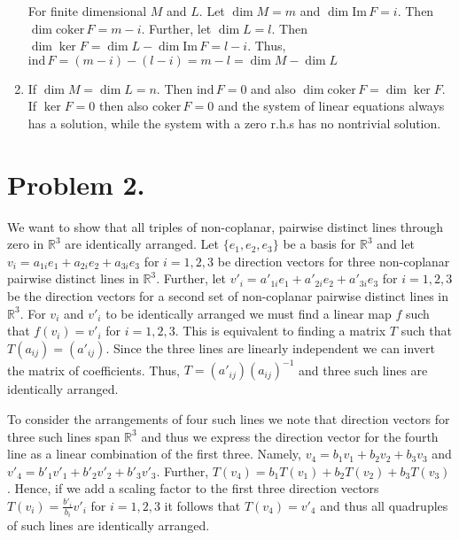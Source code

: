 \documentclass[11pt]{amsart}
\newcommand{\field}[1]{\mathbb{#1}}
\newcommand{\coker}{\textrm{coker}\,}
\newcommand{\Image}{\textrm{Im}\,}
\newcommand{\ind}{\textrm{ind}\,}
\begin{document}
\begin{enumerate}
  For finite dimensional $M$ and $L$. Let $\dim M=m$ and $\dim \Image
  F=i$. Then $\dim \coker F=m-i$.  Further, let $\dim L=l$. Then $\dim
  \ker F = \dim L - \dim \Image F = l-i$. Thus, $\ind F = (m-i) -
  (l-i) = m-l= \dim M - \dim L$ 
\item If $\dim M=\dim L=n$. Then $\ind F=0$ and also $\dim \coker F =
  \dim \ker F$. If $\ker F=0$ then also $\coker F=0$ and the system of
  linear equations always has a solution, while the system with a zero
  r.h.s has no nontrivial solution.

\end{enumerate} 

\section*{Problem 2.}
We want to show that all triples of non-coplanar, pairwise distinct
lines through zero in $\field{R}^3$ are identically arranged.  Let
$\{e_1,e_2,e_3\}$ be a basis for $\field{R}^3$ and let $v_i =
a_{1i}e_1 + a_{2i}e_2+ a_{3i}e_3$ for $i=1,2,3$ be direction
vectors for three non-coplanar pairwise distinct lines in
$\field{R}^3$.  Further, let $v'_i = a'_{1i}e_1 + a'_{2i}e_2+
a'_{3i}e_3$ for $i=1,2,3$ be the direction vectors for a second set of
non-coplanar pairwise distinct lines in $\field{R}^3$.  For $v_i$ and
$v'_i$ to be identically arranged we must find a linear map $f$ such
that $f(v_i)=v'_i$ for $i=1,2,3$. This is equivalent to finding a
matrix $T$ such that $T(a_{ij})=(a'_{ij})$. Since the three lines are
linearly independent we can invert the matrix of coefficients. Thus,
$T=(a'_{ij})(a_{ij})^{-1}$ and three such lines are identically
arranged.

To consider the arrangements of four such lines we note that direction
vectors for three such lines span $\field{R}^3$ and thus we express
the direction vector for the fourth line as a linear combination of
the first three. Namely, $v_4=b_1v_1+b_2v_2+b_3v_3$ and
$v'_4=b'_1v'_1+b'_2v'_2+b'_3v'_3$.  Further,
$T(v_4)=b_1T(v_1)+b_2T(v_2)+b_3T(v_3)$. Hence, if we add a scaling
factor to the first three direction vectors
$T(v_i)=\frac{b'_i}{b_i}v'_i$ for $i=1,2,3$ it follows that
$T(v_4)=v'_4$ and thus all quadruples of such lines are identically
arranged.
\end{document}
